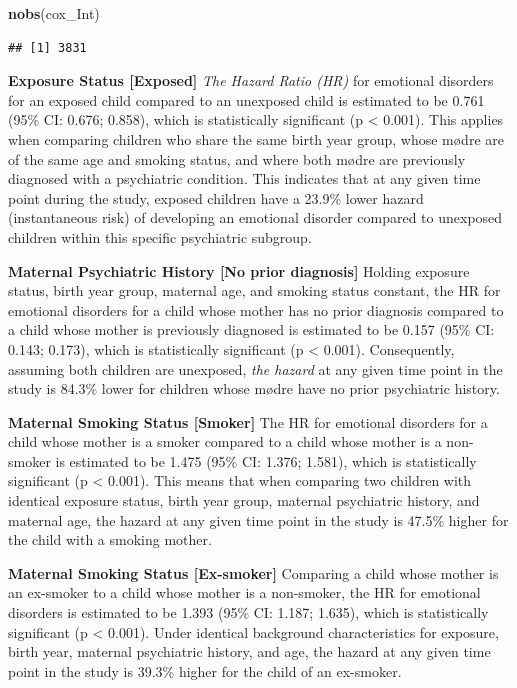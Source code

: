 \documentclass[
]{article}
\newenvironment{Shaded}{\begin{snugshade}}{\end{snugshade}}
\newcommand{\FunctionTok}[1]{\textcolor[rgb]{0.13,0.29,0.53}{\textbf{#1}}}
\newcommand{\NormalTok}[1]{#1}
\begin{document}
\begin{Shaded}
\begin{Highlighting}[]
\FunctionTok{nobs}\NormalTok{(cox\_Int)}
\end{Highlighting}
\end{Shaded}

\begin{verbatim}
## [1] 3831
\end{verbatim}

\textbf{Exposure Status {[}Exposed{]}} \emph{The Hazard Ratio (HR)} for
emotional disorders for an exposed child compared to an unexposed child
is estimated to be 0.761 (95\% CI: 0.676; 0.858), which is statistically
significant (p \textless{} 0.001). This applies when comparing children
who share the same birth year group, whose mødre are of the same age and
smoking status, and where both mødre are previously diagnosed with a
psychiatric condition. This indicates that at any given time point
during the study, exposed children have a 23.9\% lower hazard
(instantaneous risk) of developing an emotional disorder compared to
unexposed children within this specific psychiatric subgroup.

\textbf{Maternal Psychiatric History {[}No prior diagnosis{]}} Holding
exposure status, birth year group, maternal age, and smoking status
constant, the HR for emotional disorders for a child whose mother has no
prior diagnosis compared to a child whose mother is previously diagnosed
is estimated to be 0.157 (95\% CI: 0.143; 0.173), which is statistically
significant (p \textless{} 0.001). Consequently, assuming both children
are unexposed, \emph{the hazard} at any given time point in the study is
84.3\% lower for children whose mødre have no prior psychiatric history.

\textbf{Maternal Smoking Status {[}Smoker{]}} The HR for emotional
disorders for a child whose mother is a smoker compared to a child whose
mother is a non-smoker is estimated to be 1.475 (95\% CI: 1.376; 1.581),
which is statistically significant (p \textless{} 0.001). This means
that when comparing two children with identical exposure status, birth
year group, maternal psychiatric history, and maternal age, the hazard
at any given time point in the study is 47.5\% higher for the child with
a smoking mother.

\textbf{Maternal Smoking Status {[}Ex-smoker{]}} Comparing a child whose
mother is an ex-smoker to a child whose mother is a non-smoker, the HR
for emotional disorders is estimated to be 1.393 (95\% CI: 1.187;
1.635), which is statistically significant (p \textless{} 0.001). Under
identical background characteristics for exposure, birth year, maternal
psychiatric history, and age, the hazard at any given time point in the
study is 39.3\% higher for the child of an ex-smoker.
\end{document}
